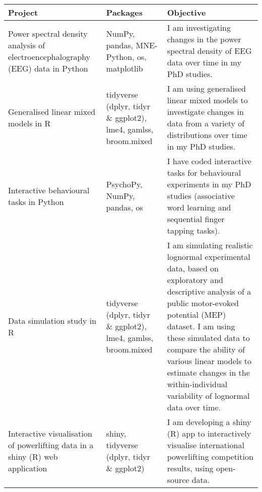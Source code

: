\begin{table}[!h]
	\centering\begingroup\fontsize{12}{12}\selectfont
	
	\begin{tabular}{>{\raggedright\arraybackslash}p{5.5cm}>{\raggedright\arraybackslash}p{3.3cm}>{\raggedright\arraybackslash}p{9cm}}
	
	\textbf{Project} & \textbf{Packages} & \textbf{Objective}\\
	\midrule
	Power spectral density analysis of electroencephalography (EEG) data in Python & NumPy, pandas, MNE-Python, os, matplotlib & I am investigating changes in the power spectral density of EEG data over time in my PhD studies.\\
	\addlinespace
	Generalised linear mixed models in R & tidyverse (dplyr, tidyr \& ggplot2), lme4, gamlss, broom.mixed & I am using generalised linear mixed models to investigate changes in data from a variety of distributions over time in my PhD studies.\\
	\addlinespace
	Interactive behavioural tasks in Python & PsychoPy, NumPy, pandas, os & I have coded interactive tasks for behavioural experiments in my PhD studies (associative word learning and sequential finger tapping tasks).\\
	\addlinespace
	Data simulation study in R & tidyverse (dplyr, tidyr \& ggplot2), lme4, gamlss, broom.mixed & I am simulating realistic lognormal experimental data, based on exploratory and descriptive analysis of a public motor-evoked potential (MEP) dataset. I am using these simulated data to compare the ability of various linear models to estimate changes in the within-individual variability of lognormal data over time.\\
	\addlinespace
	Interactive visualisation of powerlifting data in a shiny (R) web application & shiny, tidyverse (dplyr, tidyr \& ggplot2) & I am developing a shiny (R) app to interactively visualise international powerlifting competition results, using open-source data.\\
	
	\end{tabular}
	\endgroup{}
\end{table}